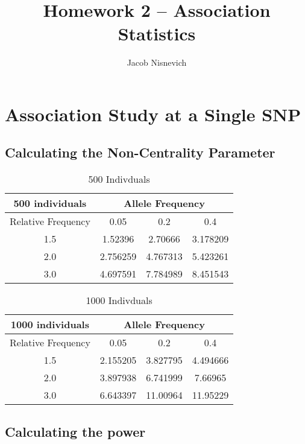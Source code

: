 \documentclass{article}
\begin{document}
\title{Homework 2 -- Association Statistics}
\author{Jacob Nisnevich}

\maketitle

\section{Association Study at a Single SNP}

\subsection{Calculating the Non-Centrality Parameter}

\begin{table}[H]
	\centering
	\begin{tabular}{| c | c | c | c |}
		\hline
		500 individuals & \multicolumn{3}{|c|}{Allele Frequency} \\
		\hline
		Relative Frequency & 0.05 & 0.2 & 0.4 \\
		\hline
		1.5 & 1.52396 & 2.70666 & 3.178209 \\
		\cline{2-4}
		2.0 & 2.756259 & 4.767313 & 5.423261 \\
		\cline{2-4}
		3.0 & 4.697591 & 7.784989 & 8.451543 \\
		\hline
	\end{tabular}
	\caption{500 Indivduals}
\end{table}

\begin{table}[H]
	\centering
	\begin{tabular}{| c | c | c | c |}
		\hline
		1000 individuals & \multicolumn{3}{|c|}{Allele Frequency} \\
		\hline
		Relative Frequency & 0.05 & 0.2 & 0.4 \\
		\hline
		1.5 & 2.155205 & 3.827795 & 4.494666 \\
		\cline{2-4}
		2.0 & 3.897938 & 6.741999 & 7.66965 \\
		\cline{2-4}
		3.0 & 6.643397 & 11.00964 & 11.95229 \\
		\hline
	\end{tabular}
	\caption{1000 Indivduals}
\end{table}

\subsection{Calculating the power}
\end{document}
